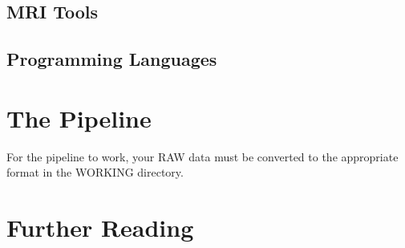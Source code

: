 \documentclass[final,titlepage,letterpaper,oneside,12pt]{article}
\begin{document}
\subsection{MRI Tools}
\subsection{Programming Languages}

\section{The Pipeline}

For the pipeline to work, your RAW data must be converted to the appropriate format in the WORKING directory.

\section{Further Reading}

\newpage 


\end{document}
